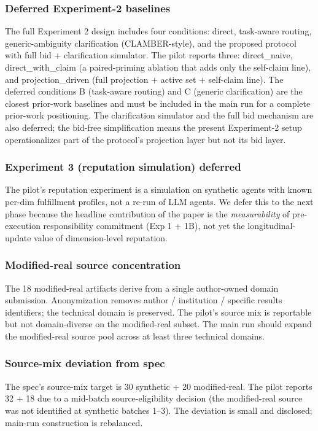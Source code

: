 \subsubsection{Deferred Experiment-2 baselines}
The full Experiment 2 design includes four conditions: direct, task-aware routing, generic-ambiguity clarification (CLAMBER-style), and the proposed protocol with full bid + clarification simulator. The pilot reports three: direct\_naive, direct\_with\_claim (a paired-priming ablation that adds only the self-claim line), and projection\_driven (full projection + active set + self-claim line). The deferred conditions B (task-aware routing) and C (generic clarification) are the closest prior-work baselines and must be included in the main run for a complete prior-work positioning. The clarification simulator and the full bid mechanism are also deferred; the bid-free simplification means the present Experiment-2 setup operationalizes part of the protocol's projection layer but not its bid layer.

\subsubsection{Experiment 3 (reputation simulation) deferred}
The pilot's reputation experiment is a simulation on synthetic agents with known per-dim fulfillment profiles, not a re-run of LLM agents. We defer this to the next phase because the headline contribution of the paper is the \emph{measurability} of pre-execution responsibility commitment (Exp 1 + 1B), not yet the longitudinal-update value of dimension-level reputation.

\subsubsection{Modified-real source concentration}
The 18 modified-real artifacts derive from a single author-owned domain submission. Anonymization removes author / institution / specific results identifiers; the technical domain is preserved. The pilot's source mix is reportable but not domain-diverse on the modified-real subset. The main run should expand the modified-real source pool across at least three technical domains.

\subsubsection{Source-mix deviation from spec}
The spec's source-mix target is 30 synthetic + 20 modified-real. The pilot reports 32 + 18 due to a mid-batch source-eligibility decision (the modified-real source was not identified at synthetic batches 1--3). The deviation is small and disclosed; main-run construction is rebalanced.

